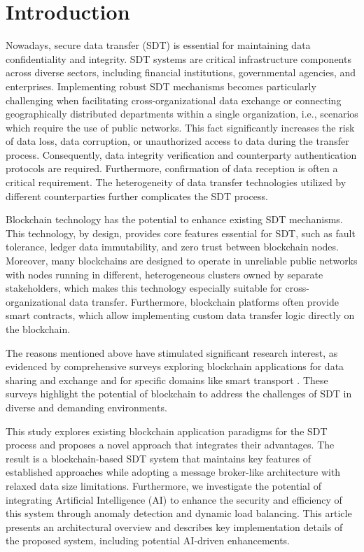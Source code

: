 \documentclass[10pt]{llncs}
\begin{document}
\section{Introduction}

Nowadays, secure data transfer (SDT) is essential for maintaining data confidentiality and integrity. 
SDT systems are critical infrastructure components across diverse sectors, including financial institutions, governmental agencies, and enterprises.
Implementing robust SDT mechanisms becomes particularly challenging when facilitating cross-organizational data exchange or connecting geographically distributed 
departments within a single organization, i.e., scenarios which require the use of public networks. 
This fact significantly increases the risk of data loss, data corruption, or unauthorized access to data during the transfer process. 
Consequently, data integrity verification and counterparty authentication protocols are required. 
Furthermore, confirmation of data reception is often a critical requirement. 
The heterogeneity of data transfer technologies utilized by different counterparties further complicates the SDT process.

Blockchain technology has the potential to enhance existing SDT mechanisms. 
This technology, by design, provides core features essential for SDT, such as fault tolerance, ledger data immutability, and zero trust between blockchain nodes. 
Moreover, many blockchains are designed to operate in unreliable public networks with nodes running in different, heterogeneous clusters owned by separate stakeholders, 
which makes this technology especially suitable for cross-organizational data transfer. 
Furthermore, blockchain platforms often provide smart contracts, which allow implementing custom data transfer logic directly on the blockchain.

The reasons mentioned above have stimulated significant research interest, as evidenced by comprehensive surveys exploring blockchain applications for data sharing and exchange \cite{Song2023} and for specific domains like smart transport \cite{Bagga2022}. 
These surveys highlight the potential of blockchain to address the challenges of SDT in diverse and demanding environments.

This study explores existing blockchain application paradigms for the SDT process and proposes a novel approach that integrates their advantages. 
The result is a blockchain-based SDT system that maintains key features of established approaches while adopting a message broker-like architecture with relaxed data size limitations. 
Furthermore, we investigate the potential of integrating Artificial Intelligence (AI) to enhance the security and efficiency of this system through anomaly detection and dynamic load balancing.
This article presents an architectural overview and describes key implementation details of the proposed system, including potential AI-driven enhancements.
\end{document}
